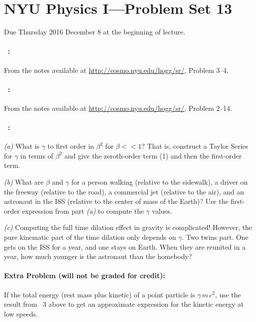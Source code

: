 \documentclass[12pt]{article}
\begin{document}
\section*{NYU Physics I---Problem Set 13}

Due Thursday 2016 December 8 at the beginning of lecture.

\paragraph{\problemname~\theproblem:}%
From the notes available at \url{http://cosmo.nyu.edu/hogg/sr/},
Problem 3--4.

\paragraph{\problemname~\theproblem:}%
From the notes available at \url{http://cosmo.nyu.edu/hogg/sr/},
Problem 2--14.

\paragraph{\problemname~\theproblem:}%
\textsl{(a)} What is $\gamma$ to first order in $\beta^2$ for $\beta
<< 1$? That is, construct a Taylor Series for $\gamma$ in terms of
$\beta^2$ and give the zeroth-order term (1) and then the first-order
term.

\textsl{(b)} What are $\beta$ and $\gamma$ for a person walking
(relative to the sidewalk), a driver on the freeway (relative to the
road), a commercial jet (relative to the air), and an astronaut in the
ISS (relative to the center of mass of the Earth)? Use the first-order
expression from part \textsl{(a)} to compute the $\gamma$ values.

\textsl{(c)} Computing the full time dilation effect in gravity is
complicated! However, the pure kinematic part of the time dilation
only depends on $\gamma$. Two twins part. One gets on the ISS for a
year, and one stays on Earth. When they are reunited in a year, how
much younger is the astronaut than the homebody?

\paragraph{Extra Problem (will not be graded for credit):}%
If the total energy (rest mass plus kinetic) of a point particle is
$\gamma\,m\,c^2$, use the result from \problemname~3 above to get an
approximate expression for the kinetic energy at low speeds.
\end{document}
